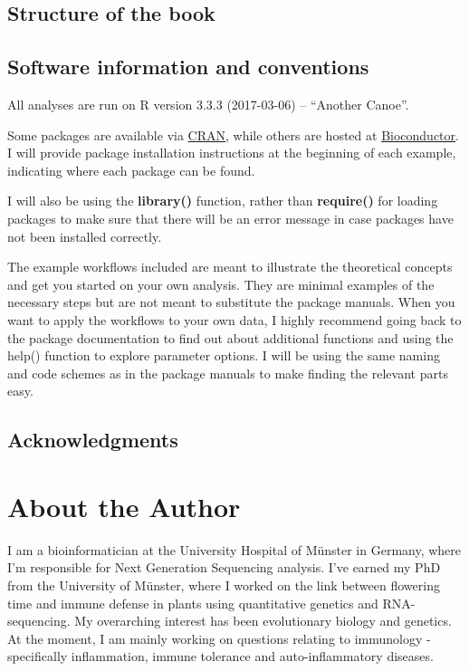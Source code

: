 \documentclass[12pt,]{book}
\begin{document}
\section*{Structure of the book}\label{structure-of-the-book}


\section*{Software information and
conventions}\label{software-information-and-conventions}


All analyses are run on R version 3.3.3 (2017-03-06) -- ``Another
Canoe''.

Some packages are available via
\href{https://cran.r-project.org/}{CRAN}, while others are hosted at
\href{https://www.bioconductor.org/}{Bioconductor}. I will provide
package installation instructions at the beginning of each example,
indicating where each package can be found.

I will also be using the \textbf{library()} function, rather than
\textbf{require()} for loading packages to make sure that there will be
an error message in case packages have not been installed correctly.

The example workflows included are meant to illustrate the theoretical
concepts and get you started on your own analysis. They are minimal
examples of the necessary steps but are not meant to substitute the
package manuals. When you want to apply the workflows to your own data,
I highly recommend going back to the package documentation to find out
about additional functions and using the help() function to explore
parameter options. I will be using the same naming and code schemes as
in the package manuals to make finding the relevant parts easy.

\section*{Acknowledgments}\label{acknowledgments}


\chapter*{About the Author}\label{about-the-author}


I am a bioinformatician at the University Hospital of Münster in
Germany, where I'm responsible for Next Generation Sequencing analysis.
I've earned my PhD from the University of Münster, where I worked on the
link between flowering time and immune defense in plants using
quantitative genetics and RNA-sequencing. My overarching interest has
been evolutionary biology and genetics. At the moment, I am mainly
working on questions relating to immunology - specifically inflammation,
immune tolerance and auto-inflammatory diseases.
\end{document}
